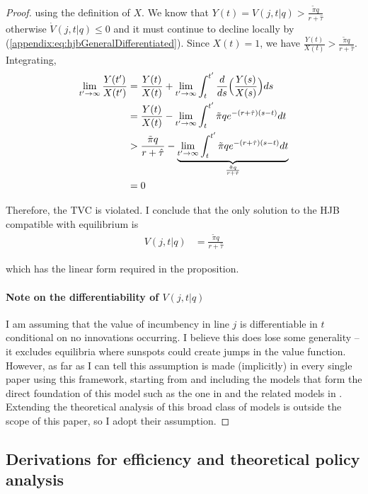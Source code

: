 \documentclass[11pt,english]{article}
\begin{document}
\begin{proof}
	using the definition of $X$. We know that $Y(t) = V(j,t|q) > \frac{\tilde{\pi} q}{r + \hat{\tau}}$ otherwise $\dot{V}(j,t|q) \le 0$ and it must continue to decline locally by (\ref{appendix:eq:hjbGeneralDifferentiated}). Since $X(t) = 1$, we have $\frac{Y(t)}{X(t)} > \frac{\tilde{\pi} q}{r + \hat{\tau}}$. Integrating, 
	\begin{align}
	\lim_{t' \to \infty} \frac{Y(t')}{X(t')} &=  \frac{Y(t)}{X(t)} + \lim_{t' \to \infty} \int_t^{t'} \frac{d}{ds} \Big(\frac{Y(s)}{X(s)} \Big) ds \\
	&= \frac{Y(t)}{X(t)} - \lim_{t' \to \infty} \int_t^{t'}  \tilde{\pi} q e^{-(r +\hat{\tau}) (s-t)} dt \\
	&> \frac{\tilde{\pi} q}{r + \hat{\tau}} - \underbrace{\lim_{t' \to \infty} \int_t^{t'}  \tilde{\pi} q e^{-(r +\hat{\tau}) (s-t)} dt}_{\mathclap{\frac{\tilde{\pi}q}{r + \hat{\tau}}}} \\ 
	&= 0
	\end{align}
	
	Therefore, the TVC is violated. I conclude that the only solution to the HJB compatible with equilibrium is 
	\begin{align}
	V(j,t|q) &= \frac{\tilde{\pi} q}{r + \hat{\tau}}
	\end{align}	
	
	which has the linear form required in the proposition.
	
	\paragraph{Note on the differentiability of $V(j,t|q)$}
	
	I am assuming that the value of incumbency in line $j$ is differentiable in $t$ conditional on no innovations occurring. I believe this does lose some generality -- it excludes equilibria where sunspots could create jumps in the value function. However, as far as I can tell this assumption is made (implicitly) in every single paper using this framework, starting from \cite{grossman_quality_1991} and including the models that form the direct foundation of this model such as the one in \cite{acemoglu_innovation_2015} and the related models in \cite{acemoglu_introduction_2009}. Extending the theoretical analysis of this broad class of models is outside the scope of this paper, so I adopt their assumption. 
	
\end{proof}

\subsection{Derivations for efficiency and theoretical policy analysis}
\end{document}
